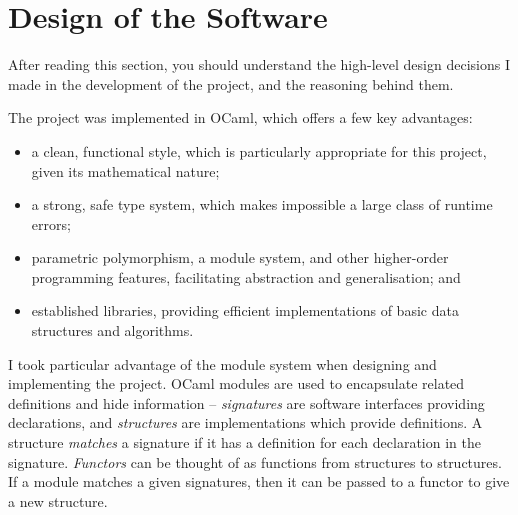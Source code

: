\documentclass[12pt,a4paper,twoside,openright]{report}
\begin{document}
\section{Design of the Software}
After reading this section, you
should understand the high-level
design decisions I made in the
development of the project, and
the reasoning behind them.
\bigskip

\noindent
The project was implemented in OCaml, which
offers a few key advantages:
\begin{itemize}
	\item a clean, functional
	style, which is particularly appropriate for
	this project, given its mathematical nature;
	\item a strong, safe type system, which makes
	impossible a large class of runtime errors;
	\item parametric polymorphism, a module system,
	and other higher-order programming features,
	facilitating abstraction and generalisation; and
	\item established libraries, providing efficient
	implementations of basic data structures and algorithms.
\end{itemize}
I took particular advantage of the module system when
designing and implementing the project. OCaml modules
are used to encapsulate related definitions and hide
information -- \emph{signatures} are software interfaces
providing declarations,
and \emph{structures} are implementations which 
provide definitions. A structure \emph{matches} a
signature if it has a definition for each declaration
in the signature. \emph{Functors} can be thought of
as functions from structures to structures. If a
module matches a given signatures, then it can be
passed to a functor to give a new structure.
\end{document}
